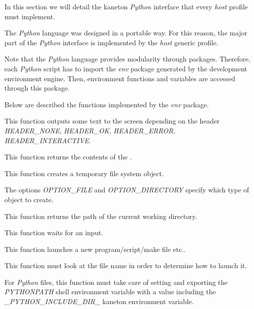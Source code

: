 

In this section we will detail the kaneton \textit{Python} interface that
every \textit{host} profile must implement.

The \textit{Python} language was designed in a portable way. For this
reason, the major part of the \textit{Python} interface is implemented
by the \textit{host} generic profile.

Note that the \textit{Python} language provides modularity through packages.
Therefore, each \textit{Python} script has to import the \textit{env} package
generated by the development environment engine. Then, environment functions
and variables are accessed through this package.

Below are described the functions implemented by the \textit{env} package.

         {
	   This function outputs some text to the screen depending on the
	   header \textit{HEADER\_NONE}, \textit{HEADER\_OK},
	   \textit{HEADER\_ERROR}, \textit{HEADER\_INTERACTIVE}.
	 }

         {
	   This function returns the contents of the .
	 }

         {
	   This function creates a temporary file system object.

	   \-

	   The options \textit{OPTION\_FILE} and \textit{OPTION\_DIRECTORY}
	   specify which type of object to create.
	 }

         {
	   This function returns the path of the current working directory.
	 }

         {
	   This function waits for an input.
	 }

         {
	   This function launches a new program/script/make file etc..

	   \-

	   This function must look at the file name in order to determine
	   how to launch it.

	   \-

	   For \textit{Python} files, this function must take care of
	   setting and exporting the \textit{PYTHONPATH} shell environment
	   variable with a value including the
	   \textit{\_PYTHON\_INCLUDE\_DIR\_} kaneton environment variable.
	 }

